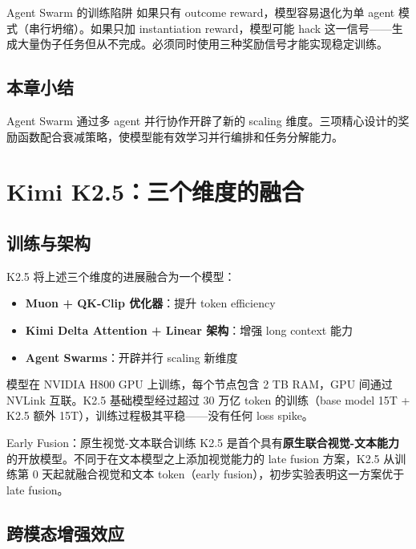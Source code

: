 \documentclass[a4paper]{article}
\begin{document}
\begin{warningbox}{Agent Swarm 的训练陷阱}
如果只有 outcome reward，模型容易退化为单 agent 模式（串行坍缩）。如果只加 instantiation reward，模型可能 hack 这一信号——生成大量伪子任务但从不完成。必须同时使用三种奖励信号才能实现稳定训练。
\end{warningbox}

\subsection{本章小结}

Agent Swarm 通过多 agent 并行协作开辟了新的 scaling 维度。三项精心设计的奖励函数配合衰减策略，使模型能有效学习并行编排和任务分解能力。


\section{Kimi K2.5：三个维度的融合}

\subsection{训练与架构}

K2.5 将上述三个维度的进展融合为一个模型：
\begin{itemize}
    \item \textbf{Muon + QK-Clip 优化器}：提升 token efficiency
    \item \textbf{Kimi Delta Attention + Linear 架构}：增强 long context 能力
    \item \textbf{Agent Swarms}：开辟并行 scaling 新维度
\end{itemize}

模型在 NVIDIA H800 GPU 上训练，每个节点包含 2 TB RAM，GPU 间通过 NVLink 互联。K2.5 基础模型经过超过 30 万亿 token 的训练（base model 15T + K2.5 额外 15T），训练过程极其平稳——没有任何 loss spike。

\begin{importantbox}{Early Fusion：原生视觉-文本联合训练}
K2.5 是首个具有\textbf{原生联合视觉-文本能力}的开放模型。不同于在文本模型之上添加视觉能力的 late fusion 方案，K2.5 从训练第 0 天起就融合视觉和文本 token（early fusion），初步实验表明这一方案优于 late fusion。
\end{importantbox}

\subsection{跨模态增强效应}
\end{document}
